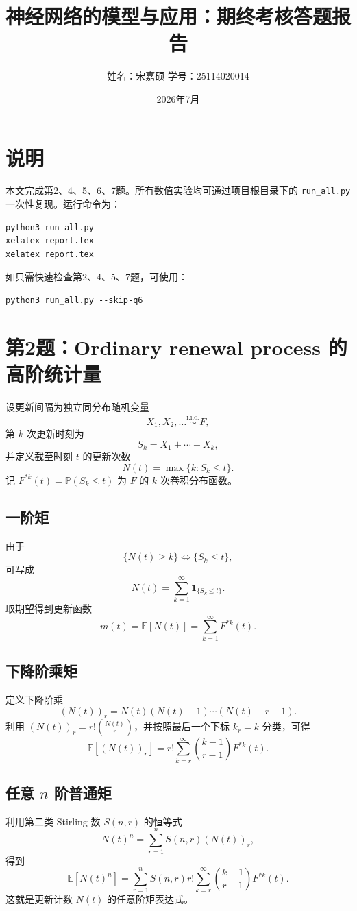 \documentclass[12pt,a4paper]{ctexart}
\title{神经网络的模型与应用：期终考核答题报告}
\author{姓名：宋嘉硕 \qquad 学号：25114020014}
\date{2026年7月}
\begin{document}
\maketitle
\tableofcontents
\newpage

\section*{说明}
本文完成第2、4、5、6、7题。所有数值实验均可通过项目根目录下的
\texttt{run\_all.py} 一次性复现。运行命令为：
\begin{verbatim}
python3 run_all.py
xelatex report.tex
xelatex report.tex
\end{verbatim}
如只需快速检查第2、4、5、7题，可使用：
\begin{verbatim}
python3 run_all.py --skip-q6
\end{verbatim}

\section{第2题：Ordinary renewal process 的高阶统计量}
设更新间隔为独立同分布随机变量
\[
X_1,X_2,\ldots \overset{\mathrm{i.i.d.}}{\sim}F,
\]
第 $k$ 次更新时刻为
\[
S_k=X_1+\cdots+X_k,
\]
并定义截至时刻 $t$ 的更新次数
\[
N(t)=\max\{k:S_k\leq t\}.
\]
记 $F^{*k}(t)=\mathbb{P}(S_k\leq t)$ 为 $F$ 的 $k$ 次卷积分布函数。

\subsection{一阶矩}
由于
\[
\{N(t)\geq k\}\Longleftrightarrow \{S_k\leq t\},
\]
可写成
\[
N(t)=\sum_{k=1}^{\infty}\mathbf{1}_{\{S_k\leq t\}}.
\]
取期望得到更新函数
\[
\boxed{m(t)=\mathbb{E}[N(t)]=\sum_{k=1}^{\infty}F^{*k}(t).}
\]

\subsection{下降阶乘矩}
定义下降阶乘
\[
(N(t))_r=N(t)(N(t)-1)\cdots(N(t)-r+1).
\]
利用 $(N(t))_r=r!\binom{N(t)}{r}$，并按照最后一个下标 $k_r=k$ 分类，可得
\[
\boxed{
\mathbb{E}[(N(t))_r]
=r!\sum_{k=r}^{\infty}\binom{k-1}{r-1}F^{*k}(t).
}
\]

\subsection{任意 $n$ 阶普通矩}
利用第二类 Stirling 数 $S(n,r)$ 的恒等式
\[
N(t)^n=\sum_{r=1}^{n}S(n,r)(N(t))_r,
\]
得到
\[
\boxed{
\mathbb{E}[N(t)^n]
=\sum_{r=1}^{n}S(n,r)r!
\sum_{k=r}^{\infty}\binom{k-1}{r-1}F^{*k}(t).
}
\]
这就是更新计数 $N(t)$ 的任意阶矩表达式。
\end{document}
